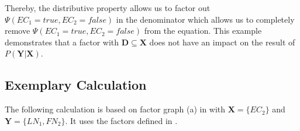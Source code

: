 Thereby, the distributive property allows us to factor out $\Psi(EC_1{=}true,EC_2{=}false)$ in the denominator which allows us to completely remove $\Psi(EC_1{=}true,EC_2{=}false)$ from the equation.
This example demonstrates that a \gls{factor} with $\mathbf{D}\subseteq\mathbf{X}$ does not have an impact on the result of $P(\mathbf{Y}|\mathbf{X})$.

\subsection{Exemplary Calculation}\label{app:subsec-crf-example-calculation}
The following calculation is based on \gls{factor graph} (a) in  with $\mathbf{X}=\{EC_2\}$ and $\mathbf{Y}=\{LN_1,FN_2\}$.
It uses the \glspl{factor} defined in .


